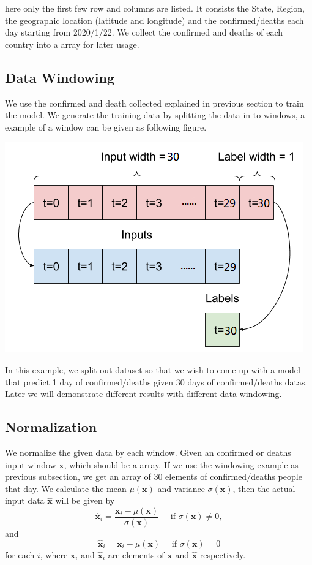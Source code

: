 \documentclass[a4paper,12pt]{article}
\begin{document}
here only the first few row and columns are listed. It consists the State, Region, the geographic location (latitude and longitude) and the confirmed/deaths each day starting from 2020/1/22. We collect the confirmed and deaths of each country into a array for later usage.
\subsection{Data Windowing}
We use the confirmed and death collected explained in previous section to train the model. We generate the training data by splitting the data in to windows, a example of a window can be given as following figure.
\begin{center}
    \includegraphics{split_window.png}
\end{center}
In this example, we split out dataset so that we wish to come up with a model that predict 1 day of confirmed/deaths given 30 days of confirmed/deaths datas. Later we will demonstrate different results with different data windowing.

\subsection{Normalization}
We normalize the given data by each window. Given an confirmed or deaths input window \(\mathbf{x}\), which should be a array. If we use the windowing example as previous subsection, we get an array of $30$ elements of confirmed/deaths people that day. We calculate the mean \(\mu(\mathbf{x})\) and variance \(\sigma(\mathbf{x})\), then the actual input data \(\hat{\mathbf{x}}\) will be given by 
\[\hat{\mathbf{x}}_i = \frac{\mathbf{x}_i - \mu(\mathbf{x})}{\sigma(\mathbf{x})} \quad \text{ if } \sigma(\mathbf{x})\neq 0, \]
and 
\[\hat{\mathbf{x}}_i = \mathbf{x}_i - \mu(\mathbf{x}) \quad \text{ if } \sigma(\mathbf{x})= 0\]
for each \(i\), where \(\mathbf{x}_i\) and \(\hat{\mathbf{x}}_i\) are elements of \(\mathbf{x}\) and \(\hat{\mathbf{x}}\) respectively.
\end{document}
